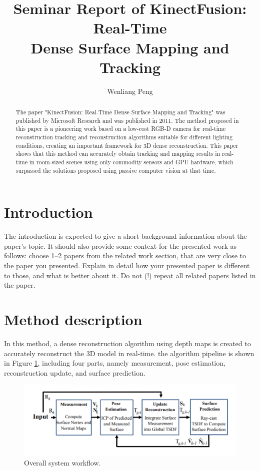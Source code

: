 \documentclass[a4paper,12pt]{article}
\title{Seminar Report of KinectFusion: Real-Time\\Dense Surface Mapping and Tracking} %
\author{Wenliang Peng} %
\institute{Faculty of Informatics - Technische Universit\"{a}t M\"{u}nchen} %
\begin{document}
\maketitle

\begin{abstract}
	The paper "KinectFusion: Real-Time Dense Surface Mapping and Tracking" was published by Microsoft Research and was published in 2011. 
	The method proposed in this paper is a pioneering work based on a low-cost RGB-D camera for real-time reconstruction tracking and reconstruction algorithms suitable for different lighting conditions, creating an important framework for 3D dense reconstruction. This paper shows that this method can accurately obtain tracking and mapping results in real-time in room-sized scenes using only commodity sensors and GPU hardware, which surpassed the solutions proposed using passive computer vision at that time.
\end{abstract}

\section{Introduction}

The introduction is expected to give a short background information about the paper's topic.
It should also provide some context for the presented work as follows:
choose 1--2 papers from the related work section, that are very close to the paper you presented.
Explain in detail how your presented paper is different to those, and what is better about it.
Do not (!) repeat all related papers listed in the paper.

 

\section{Method description}
In this method, a dense reconstruction algorithm using depth maps is created to accurately reconstruct the 3D model in real-time. 
the algorithm pipeline is shown in Figure \ref{figure1}, 
including four parts, namely measurement, pose estimation, reconstruction update, and surface prediction.
\begin{figure}[h] %
    \centering %
    \includegraphics[scale=0.6]{figure1.png} %
    \caption{Overall system workflow.} %
    \label{figure1} %
\end{figure}%
\end{document}

